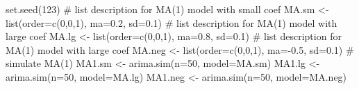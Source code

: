 \begin{Schunk}
\begin{Sinput}
 set.seed(123)
 # list description for MA(1) model with small coef
 MA.sm <- list(order=c(0,0,1), ma=0.2, sd=0.1)
 # list description for MA(1) model with large coef
 MA.lg <- list(order=c(0,0,1), ma=0.8, sd=0.1)
 # list description for MA(1) model with large coef
 MA.neg <- list(order=c(0,0,1), ma=-0.5, sd=0.1)
 # simulate MA(1)
 MA1.sm <- arima.sim(n=50, model=MA.sm)
 MA1.lg <- arima.sim(n=50, model=MA.lg)
 MA1.neg <- arima.sim(n=50, model=MA.neg)
\end{Sinput}
\end{Schunk}
